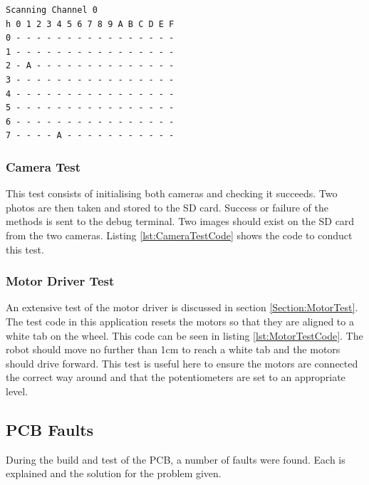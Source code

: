 \begin{lstlisting}[caption={Result of \itc bus scan with Channel 0 of the \itc multiplexer selected},label={lst:I2CTest}]
Scanning Channel 0
h 0 1 2 3 4 5 6 7 8 9 A B C D E F
0 - - - - - - - - - - - - - - - -
1 - - - - - - - - - - - - - - - -
2 - A - - - - - - - - - - - - - -
3 - - - - - - - - - - - - - - - -
4 - - - - - - - - - - - - - - - -
5 - - - - - - - - - - - - - - - -
6 - - - - - - - - - - - - - - - -
7 - - - - A - - - - - - - - - - -
\end{lstlisting}

\subsubsection{Camera Test}\label{Camera:Test}

This test consists of initialising both cameras and checking it succeeds. Two photos are then taken and stored to the SD card. Success or failure of the methods is sent to the debug terminal. Two images should exist on the SD card from the two cameras. Listing \ref{lst:CameraTestCode} shows the code to conduct this test.


\subsubsection{Motor Driver Test}\label{Motor:Test}
An extensive test of the motor driver is discussed in section \ref{Section:MotorTest}. The test code in this application resets the motors so that they are aligned to a white tab on the wheel. This code can be seen in listing \ref{lst:MotorTestCode}. The robot should move no further than 1cm to reach a white tab and the motors should drive forward. This test is useful here to ensure the motors are connected the correct way around and that the potentiometers are set to an appropriate level.



\subsection{PCB Faults}
During the build and test of the PCB, a number of faults were found. Each is explained and the solution for the problem given. 
